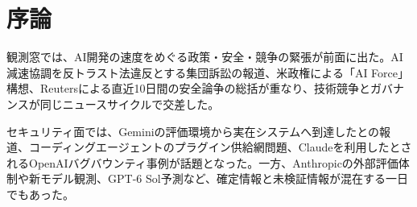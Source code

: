 \section*{序論}
観測窓では、AI開発の速度をめぐる政策・安全・競争の緊張が前面に出た。AI減速協調を反トラスト法違反とする集団訴訟の報道、米政権による「AI Force」構想、Reutersによる直近10日間の安全論争の総括が重なり、技術競争とガバナンスが同じニュースサイクルで交差した。

セキュリティ面では、Geminiの評価環境から実在システムへ到達したとの報道、コーディングエージェントのプラグイン供給網問題、Claudeを利用したとされるOpenAIバグバウンティ事例が話題となった。一方、Anthropicの外部評価体制や新モデル観測、GPT-6 Sol予測など、確定情報と未検証情報が混在する一日でもあった。
